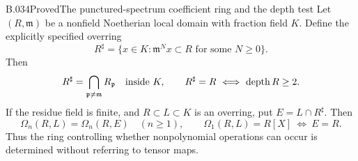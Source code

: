 \begin{saresult}{B.034}{Proved}{The punctured-spectrum coefficient ring and the depth test}
Let $(R,\mathfrak m)$ be a nonfield Noetherian local domain with
fraction field $K$. Define the explicitly specified overring
\[
 R^\sharp=\{x\in K:\mathfrak m^Nx\subset R
                    \text{ for some }N\ge0\}.
\]
Then
\[
 R^\sharp=\bigcap_{\mathfrak p\ne\mathfrak m}R_{\mathfrak p}
 \quad\hbox{inside }K,
 \qquad
 R^\sharp=R\ \Longleftrightarrow\ \operatorname{depth}R\ge2.
\]
If the residue field is finite, and $R\subset L\subset K$ is an
overring, put $E=L\cap R^\sharp$. Then
\[
 \Omega_n(R,L)=\Omega_n(R,E)\quad(n\ge1),
 \qquad
 \Omega_1(R,L)=R[X]\ \Longleftrightarrow\ E=R.
\]
Thus the ring controlling whether nonpolynomial operations can
occur is determined without referring to tensor maps.
\end{saresult}
